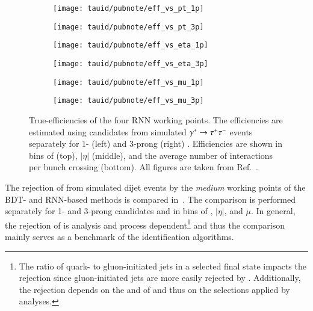 \begin{figure}[htbp]

  \begin{subfigure}{0.498\textwidth}
    \texttt{[image: tauid/pubnote/eff\_vs\_pt\_1p]}
    \subcaption{}%
    \label{fig:tauid_truetau_eff_a}
  \end{subfigure}\hfill%
  \begin{subfigure}{0.498\textwidth}
    \texttt{[image: tauid/pubnote/eff\_vs\_pt\_3p]}
    \subcaption{}%
    \label{fig:tauid_truetau_eff_b}
  \end{subfigure}

  \begin{subfigure}{0.498\textwidth}
    \texttt{[image: tauid/pubnote/eff\_vs\_eta\_1p]}
    \subcaption{}
  \end{subfigure}\hfill%
  \begin{subfigure}{0.498\textwidth}
    \texttt{[image: tauid/pubnote/eff\_vs\_eta\_3p]}
    \subcaption{}
  \end{subfigure}

  \begin{subfigure}{0.498\textwidth}
    \texttt{[image: tauid/pubnote/eff\_vs\_mu\_1p]}
    \subcaption{}
  \end{subfigure}\hfill%
  \begin{subfigure}{0.498\textwidth}
    \texttt{[image: tauid/pubnote/eff\_vs\_mu\_3p]}
    \subcaption{}
  \end{subfigure}

  \caption{True-\tauhadvis efficiencies of the four RNN \tauid working
    points. The efficiencies are estimated using \tauhadvis candidates
    from simulated $\gamma^{*} \to \tau^{+} \tau^{-}$ events separately for 1-
    (left) and 3-prong (right) \tauhadvis. Efficiencies are shown in
    bins of \tauhadvis \pT (top), \tauhadvis $|\eta|$ (middle), and
    the average number of interactions per bunch crossing
    (bottom). All figures are taken from
    Ref.~\cite{ATL-PHYS-PUB-2019-033}.}%
  \label{fig:tauid_truetau_eff}
\end{figure}

The rejection of \faketauhadvis from simulated dijet events by the
\emph{medium} \tauid working points of the BDT- and RNN-based methods
is compared in~. The comparison is
performed separately for 1- and 3-prong \tauhadvis candidates and in
bins of \tauhadvis \pT, \tauhadvis $|\eta|$, and $\mu$. In general,
the \faketauhadvis rejection of \tauid is analysis and process
dependent\footnote{The ratio of quark- to gluon-initiated jets in a
  selected final state impacts the \faketauhadvis rejection since
  gluon-initiated jets are more easily rejected by
  \tauid. Additionally, the rejection depends on the \pT and \Ntracks
  of \faketauhadvis and thus on the selections applied by analyses.}
and thus the comparison mainly serves as a benchmark of the
identification algorithms.

